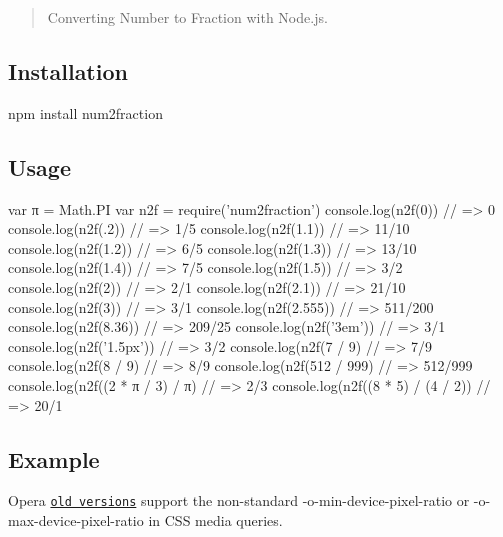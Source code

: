 \href{https://travis-ci.org/yisibl/num2fraction}{\tt } \href{https://www.npmjs.com/package/num2fraction}{\tt } \href{https://www.npmjs.com/package/num2fraction}{\tt } \href{http://opensource.org/licenses/MIT}{\tt }

\begin{quote}
Converting Number to Fraction with Node.\+js. \end{quote}


\subsection*{Installation}


\begin{DoxyCode}
npm install num2fraction
\end{DoxyCode}


\subsection*{Usage}


\begin{DoxyCode}
var π   = Math.PI
var n2f = require('num2fraction')
  console.log(n2f(0))                // => 0
  console.log(n2f(.2))               // => 1/5
  console.log(n2f(1.1))              // => 11/10
  console.log(n2f(1.2))              // => 6/5
  console.log(n2f(1.3))              // => 13/10
  console.log(n2f(1.4))              // => 7/5
  console.log(n2f(1.5))              // => 3/2
  console.log(n2f(2))                // => 2/1
  console.log(n2f(2.1))              // => 21/10
  console.log(n2f(3))                // => 3/1
  console.log(n2f(2.555))            // => 511/200
  console.log(n2f(8.36))             // => 209/25
  console.log(n2f('3em'))            // => 3/1
  console.log(n2f('1.5px'))          // => 3/2
  console.log(n2f(7 / 9)             // => 7/9
  console.log(n2f(8 / 9)             // => 8/9
  console.log(n2f(512 / 999)         // => 512/999
  console.log(n2f((2 * π / 3) / π)   // => 2/3
  console.log(n2f((8 * 5) / (4 / 2)) // => 20/1
\end{DoxyCode}


\subsection*{Example}

Opera \href{http://www.opera.com/docs/specs/presto28/css/o-vendor/}{\tt old versions} support the non-\/standard {\ttfamily -\/o-\/min-\/device-\/pixel-\/ratio} or {\ttfamily -\/o-\/max-\/device-\/pixel-\/ratio} in C\+SS media queries.


